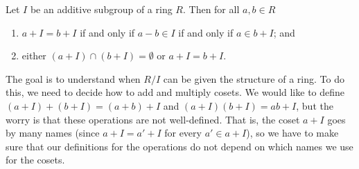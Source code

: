 \begin{fact}\label{fact.AdditiveSubgroupRingQuotientProperties}
Let $I$ be an additive subgroup of a ring $R$. Then for all $a,b\in R$
\begin{enumerate}
\item $a + I = b+I$ if and only if $a-b\in I$ if and only if $a \in b + I$; and
\item either $(a + I )\cap (b+I )= \emptyset$ or $a + I = b + I$.
\end{enumerate}
\end{fact}

The goal is to understand when $R/I$ can be given the structure of a ring. To do this, we need to decide how to add and multiply cosets. We would like to define $(a + I) + (b + I) = (a+b) + I$ and $(a + I)(b + I) = ab + I$, but the worry is that these operations are not well-defined. That is, the coset $a + I$ goes by many names (since $a+I = a'+I$ for every $a' \in a+I$), so we have to make sure that our definitions for the operations do not depend on which names we use for the cosets. 

